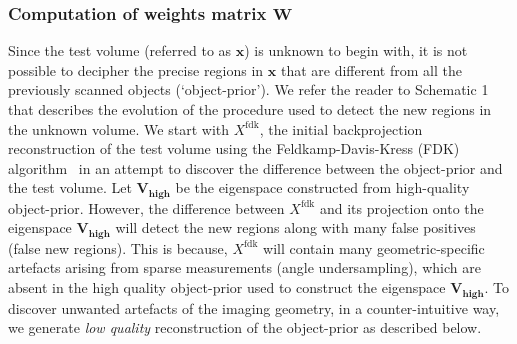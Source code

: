 \documentclass[journal]{IEEEtran}
\begin{document}
 \subsubsection{\textbf{Computation of weights matrix $\boldsymbol{W}$}}
Since the test volume (referred to as $\boldsymbol{x}$) is unknown to begin with, it is not possible to decipher the precise regions in $\boldsymbol{x}$ that are different from all the previously scanned objects (`object-prior'). We refer the reader to Schematic 1 that describes the evolution of the procedure used to detect the new regions in the unknown volume. We start with $X^{\text{fdk}}$, the initial backprojection reconstruction of the test volume using the Feldkamp-Davis-Kress (FDK) algorithm~\cite{FDK} in an attempt to discover the difference between the object-prior and the test volume. Let $\boldsymbol{V_{\text{high}}}$ be the eigenspace constructed from high-quality object-prior. However, the difference between $X^{\text{fdk}}$ and its projection onto the eigenspace $\boldsymbol{V_{\text{high}}}$ will detect the new regions along with  many false positives (false new regions). This is because, $X^{\text{fdk}}$ will contain many geometric-specific artefacts arising from sparse measurements (angle undersampling), which are absent in the high quality object-prior used to construct the eigenspace $\boldsymbol{V_{\text{high}}}$. To discover unwanted artefacts of the imaging geometry, in a counter-intuitive way, we generate \emph{low quality} reconstruction of the object-prior as described below.
\vspace{2mm}
\end{document}
